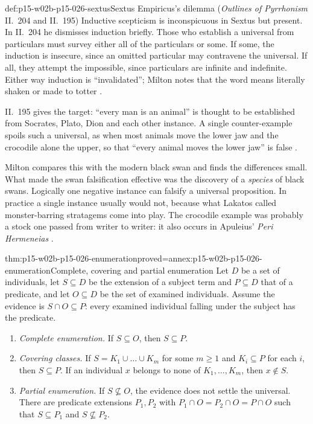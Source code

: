 \begin{hbexample}{def:p15-w02b-p15-026-sextus}{Sextus Empiricus's dilemma (\emph{Outlines of Pyrrhonism} II.~204 and II.~195)}
Inductive scepticism is inconspicuous in Sextus but present. In II.~204
he dismisses induction briefly. Those who establish a universal from
particulars must survey either all of the particulars or some. If some,
the induction is insecure, since an omitted particular may contravene the
universal. If all, they attempt the impossible, since particulars are
infinite and indefinite. Either way induction is ``invalidated''; Milton
notes that the word means literally shaken or made to totter
\cite[p.~9]{Milton2011InductionBeforeHume}.

II.~195 gives the target: ``every man is an animal'' is thought to be
established from Socrates, Plato, Dion and each other instance. A single
counter-example spoils such a universal, as when most animals move the
lower jaw and the crocodile alone the upper, so that ``every animal moves
the lower jaw'' is false \cite[p.~10]{Milton2011InductionBeforeHume}.
\end{hbexample}

Milton compares this with the modern black swan and finds the differences
small. What made the swan falsification effective was the discovery of a
\emph{species} of black swans. Logically one negative instance can falsify
a universal proposition. In practice a single instance usually would not,
because what Lakatos called monster-barring stratagems come into play. The
crocodile example was probably a stock one passed from writer to writer: it
also occurs in Apuleius' \emph{Peri Hermeneias}
\cite[p.~10]{Milton2011InductionBeforeHume}.

\begin{hblemma}{thm:p15-w02b-p15-026-enumeration}{proved=annex:p15-w02b-p15-026-enumeration}{Complete, covering and partial enumeration}
Let $D$ be a set of individuals, let $S\subseteq D$ be the extension of a
subject term and $P\subseteq D$ that of a predicate, and let $O\subseteq D$
be the set of examined individuals. Assume the evidence is
$S\cap O\subseteq P$: every examined individual falling under the subject
has the predicate.
\begin{enumerate}
\item \emph{Complete enumeration.} If $S\subseteq O$, then $S\subseteq P$.
\item \emph{Covering classes.} If $S=K_1\cup\dots\cup K_m$ for some
  $m\geq 1$ and $K_i\subseteq P$ for each $i$, then $S\subseteq P$. If an
  individual $x$ belongs to none of $K_1,\dots,K_m$, then $x\notin S$.
\item \emph{Partial enumeration.} If $S\not\subseteq O$, the evidence does
  not settle the universal. There are predicate extensions $P_1,P_2$ with
  $P_1\cap O=P_2\cap O=P\cap O$ such that $S\subseteq P_1$ and
  $S\not\subseteq P_2$.
\end{enumerate}
\end{hblemma}

